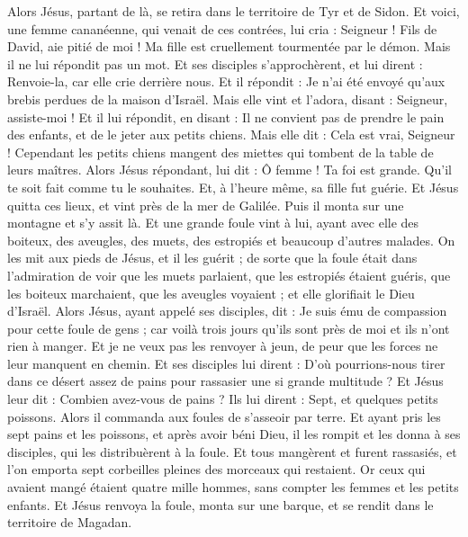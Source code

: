 \begin{multicols}{2}
Alors Jésus, partant de là, se retira dans le territoire de Tyr et de Sidon.
Et voici, une femme cananéenne, qui venait de ces contrées, lui cria : Seigneur ! Fils de David, aie pitié de moi ! Ma fille est cruellement tourmentée par le démon.
Mais il ne lui répondit pas un mot. Et ses disciples s'approchèrent, et lui dirent : Renvoie-la, car elle crie derrière nous.
Et il répondit : Je n'ai été envoyé qu'aux brebis perdues de la maison d'Israël.
Mais elle vint et l'adora, disant : Seigneur, assiste-moi !
Et il lui répondit, en disant : Il ne convient pas de prendre le pain des enfants, et de le jeter aux petits chiens.
Mais elle dit : Cela est vrai, Seigneur ! Cependant les petits chiens mangent des miettes qui tombent de la table de leurs maîtres.
Alors Jésus répondant, lui dit : Ô femme ! Ta foi est grande. Qu'il te soit fait comme tu le souhaites. Et, à l'heure même, sa fille fut guérie.
Et Jésus quitta ces lieux, et vint près de la mer de Galilée. Puis il monta sur une montagne et s'y assit là.
Et une grande foule vint à lui, ayant avec elle des boiteux, des aveugles, des muets, des estropiés et beaucoup d'autres malades. On les mit aux pieds de Jésus, et il les guérit ;
de sorte que la foule était dans l'admiration de voir que les muets parlaient, que les estropiés étaient guéris, que les boiteux marchaient, que les aveugles voyaient ; et elle glorifiait le Dieu d'Israël.
Alors Jésus, ayant appelé ses disciples, dit : Je suis ému de compassion pour cette foule de gens ; car voilà trois jours qu'ils sont près de moi et ils n'ont rien à manger. Et je ne veux pas les renvoyer à jeun, de peur que les forces ne leur manquent en chemin.
Et ses disciples lui dirent : D'où pourrions-nous tirer dans ce désert assez de pains pour rassasier une si grande multitude ?
Et Jésus leur dit : Combien avez-vous de pains ? Ils lui dirent : Sept, et quelques petits poissons.
Alors il commanda aux foules de s'asseoir par terre.
Et ayant pris les sept pains et les poissons, et après avoir béni Dieu, il les rompit et les donna à ses disciples, qui les distribuèrent à la foule.
Et tous mangèrent et furent rassasiés, et l'on emporta sept corbeilles pleines des morceaux qui restaient.
Or ceux qui avaient mangé étaient quatre mille hommes, sans compter les femmes et les petits enfants.
Et Jésus renvoya la foule, monta sur une barque, et se rendit dans le territoire de Magadan.

\end{multicols}
